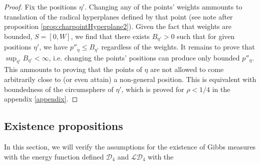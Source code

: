 \begin{remark}
\begin{proof}
Fix the positions $\eta'$.  Changing any of the points' weights ammounts to translation of the radical hyperplanes defined by that point (see note after proposition \ref{prop:charpointHyperplane2}). Given the fact that weights are bounded, $S=[0,W]$, we find that there exists $B_{\eta'}>0$ such that for given positions $\eta'$, we have $p''_\eta \leq B_{\eta'}$ regardless of the weights.
It remains to prove that $\sup_{\eta'} B_{\eta'} < \infty$, i.e. changing the points' positions can produce only bounded $p''_\eta$. This ammounts to proving that the points of $\eta$ are not allowed to come arbitrarily close to (or even attain) a non-general position. This is equivalent with boundedness of the circumsphere of $\eta'$, which is proved for $\rho<1/4$ in the appendix \ref{appendix}.
\end{proof}




\subsection{Existence propositions}
In this section, we will verify the assumptions for the existence of Gibbs measures with the energy function defined $\mathcal D_4$ and $\mathcal {LD}_4$ with the 




\end{remark}


